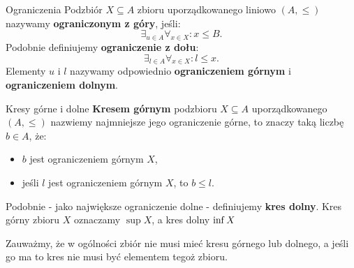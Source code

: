 \documentclass{article}
\newcounter{defi}
\numberwithin{defi}{section}
\numberwithin{defi}{section}
\renewcommand{\inf}{\mathop{\mathrm{inf}\vphantom{\mathrm{sup}}}}
\begin{document}
\begin{defr}{Ograniczenia}
    Podzbiór $X \subseteq A$ zbioru uporządkowanego liniowo $(A, \leqslant)$ nazywamy \textbf{ograniczonym z góry}, jeśli:
    \begin{equation}
        \exists_{u \in A} \forall_{x \in X} : x \leqslant B.
    \end{equation}
    Podobnie definiujemy \textbf{ograniczenie z dołu}:
    \begin{equation}
        \exists_{l \in A} \forall_{x \in X}: l \leqslant x.
    \end{equation}
    Elementy $u$ i $l$ nazywamy odpowiednio \textbf{ograniczeniem górnym} i \textbf{ograniczeniem dolnym}.
\end{defr}

\begin{defr}{Kresy górne i dolne}
    \textbf{Kresem górnym} podzbioru $X \subseteq A$ uporządkowanego $(A, \leqslant)$ nazwiemy najmniejsze jego ograniczenie górne, to znaczy taką liczbę $b \in A$, że:
    \begin{itemize}
        \item $b$ jest ograniczeniem górnym $X$,
        \item jeśli $l$ jest ograniczeniem górnym $X$, to $b \leqslant l$.
    \end{itemize}
    Podobnie - jako największe ograniczenie dolne - definiujemy \textbf{kres dolny}.
    Kres górny zbioru $X$ oznaczamy $\sup{X}$, a kres dolny $\inf{X}$
\end{defr}
Zauważmy, że w ogólności zbiór nie musi mieć kresu górnego lub dolnego, a jeśli go ma to kres nie musi być elementem tegoż zbioru.
\end{document}
